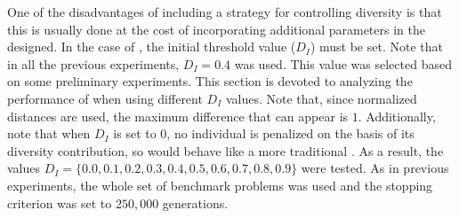 One of the disadvantages of including a strategy for controlling diversity is that this is usually done at the cost of
incorporating additional parameters in the \EA{} designed.
%
In the case of \VSDMOEA{}, the initial threshold value ($D_I$) must be set.
%
Note that in all the previous experiments, $D_I = 0.4$ was used.
%
This value was selected based on some preliminary experiments.
%
This section is devoted to analyzing the performance of \VSDMOEA{} when using different $D_I$ values. 
%
Note that, since normalized distances are used, the maximum difference that can appear is $1$.
%
Additionally, note that when $D_I$ is set to 0, no individual is penalized on the basis of its diversity contribution,
so \VSDMOEA{} would behave like a more traditional \MOEA{}.
%
As a result, the values $D_I = \{0.0, 0.1, 0.2, 0.3, 0.4, 0.5, 0.6, 0.7, 0.8, 0.9\}$ were tested.
%
As in previous experiments, the whole set of benchmark problems was used and
the stopping criterion was set to $250,000$ generations.

